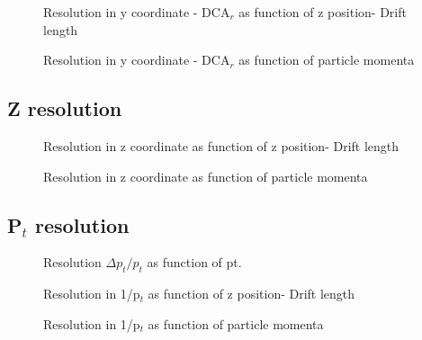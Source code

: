 \documentclass{elsart}
\begin{document}
\begin{figure}
  \centering{}
  \centering{}
  \caption{Resolution in y coordinate - DCA$_r$ as function of z position- Drift length}
  \label{figYvsZ}
\end{figure}

\begin{figure}
  \centering{}
  \centering{}
  \caption{Resolution in y coordinate - DCA$_r$ as function of particle momenta}
  \label{figYvs1Pt}
\end{figure}


\subsection { Z resolution}




\begin{figure}
  \centering{}
  \centering{}
  \caption{Resolution in z coordinate  as function of z position- Drift length}
  \label{figZvsZ}
\end{figure}

\begin{figure}
  \centering{}
  \centering{}
  \caption{Resolution in z coordinate  as function of particle momenta}
  \label{figZvs1pt}
\end{figure}



\subsection { P$_t$ resolution}



\begin{figure}
  \centering{}
  \centering{}
  \caption{Resolution $\Delta p_{t}/p_{t}$  as function of pt.}
  \label{figPtvsPt}
\end{figure}


\begin{figure}
  \centering{}
  \centering{}
  \caption{Resolution in 1/p$_t$  as function of z position- Drift length}
  \label{fig1PtvsZ}
\end{figure}

\begin{figure}
  \centering{}
  \centering{}
  \caption{Resolution in 1/p$_t$  as function of particle momenta}
  \label{fig1Ptvs1pt}
\end{figure}
\end{document}
